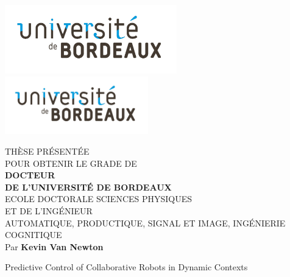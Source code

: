 
\pagestyle{empty}
{
\includegraphics[scale=1, height=3cm, keepaspectratio]{images/brdx.pdf}
\hfill
\includegraphics[scale=1, height=2.5cm]{images/brdx.pdf}
\hfill
\begin{center}
\doublespacing
\begin{Large}

THÈSE PRÉSENTÉE\\ POUR OBTENIR LE GRADE DE \\
{\LARGE \textbf{DOCTEUR\\DE L'UNIVERSITÉ DE BORDEAUX} } \\
\vspace{0.55cm}
ECOLE DOCTORALE SCIENCES PHYSIQUES \\ ET DE L'INGÉNIEUR \\
{ %
  \fontsize{10pt}{10pt}\selectfont
  AUTOMATIQUE, PRODUCTIQUE, SIGNAL ET IMAGE, INGÉNIERIE COGNITIQUE} \\
\vspace{0.55cm}
Par \textbf{Kevin Van Newton} \\
\vspace{0.55cm}

{
  \fontsize{24}{12}\selectfont
  Predictive Control of Collaborative Robots in Dynamic Contexts
}


\end{Large}
\end{center}}
